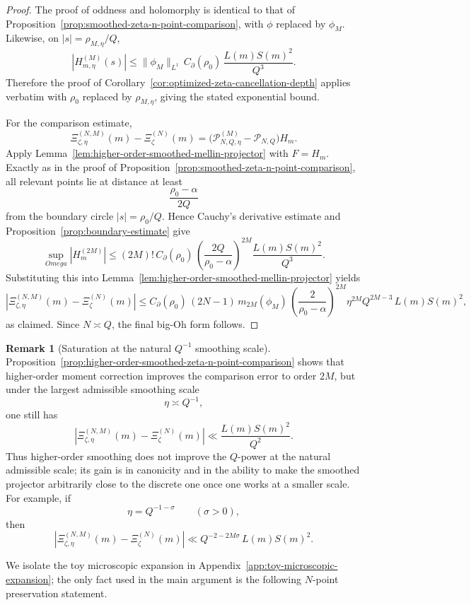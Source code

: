 \documentclass[11pt,a4paper]{amsart}
\def\Omega{Omega}%
\theoremstyle{plain}
\theoremstyle{definition}
\newtheorem{remark}[theorem]{Remark}
\begin{document}
\begin{proof}
The proof of oddness and holomorphy is identical to that of
Proposition~\ref{prop:smoothed-zeta-n-point-comparison}, with $\phi$ replaced
by $\phi_M$. Likewise, on $|s|=\rho_{M,\eta}/Q$,
\[
|H_{m,\eta}^{(M)}(s)|
\le
\|\phi_M\|_{L^1}\,C_{\partial}(\rho_0)\,\frac{L(m)S(m)^2}{Q^3}.
\]
Therefore the proof of
Corollary~\ref{cor:optimized-zeta-cancellation-depth} applies verbatim with
$\rho_0$ replaced by $\rho_{M,\eta}$, giving the stated exponential bound.

For the comparison estimate,
\[
\Xi_{\zeta,\eta}^{(N,M)}(m)-\Xi_{\zeta}^{(N)}(m)
=
\bigl(\mathcal P_{N,Q,\eta}^{(M)}-\mathcal P_{N,Q}\bigr)H_m.
\]
Apply Lemma~\ref{lem:higher-order-smoothed-mellin-projector} with $F=H_m$.
Exactly as in the proof of
Proposition~\ref{prop:smoothed-zeta-n-point-comparison}, all relevant points
lie at distance at least
\[
\frac{\rho_0-\alpha}{2Q}
\]
from the boundary circle $|s|=\rho_0/Q$. Hence Cauchy's derivative estimate
and Proposition~\ref{prop:boundary-estimate} give
\[
\sup_{\Omega}|H_m^{(2M)}|
\le
(2M)!\,C_{\partial}(\rho_0)\,
\left(\frac{2Q}{\rho_0-\alpha}\right)^{2M}
\frac{L(m)S(m)^2}{Q^3}.
\]
Substituting this into Lemma~\ref{lem:higher-order-smoothed-mellin-projector}
yields
\[
|\Xi_{\zeta,\eta}^{(N,M)}(m)-\Xi_{\zeta}^{(N)}(m)|
\le
C_{\partial}(\rho_0)\,(2N-1)\,m_{2M}(\phi_M)\,
\left(\frac{2}{\rho_0-\alpha}\right)^{2M}
\eta^{2M}Q^{2M-3}\,
L(m)S(m)^2,
\]
as claimed. Since $N\asymp Q$, the final big-Oh form follows.
\end{proof}

\begin{remark}[Saturation at the natural $Q^{-1}$ smoothing scale]
\label{rem:higher-order-smoothing-saturation}
Proposition~\ref{prop:higher-order-smoothed-zeta-n-point-comparison} shows that
higher-order moment correction improves the comparison error to order
$2M$, but under the largest admissible smoothing scale
\[
\eta\asymp Q^{-1},
\]
one still has
\[
|\Xi_{\zeta,\eta}^{(N,M)}(m)-\Xi_{\zeta}^{(N)}(m)|
\ll
\frac{L(m)S(m)^2}{Q^2}.
\]
Thus higher-order smoothing does not improve the $Q$-power at the natural
admissible scale; its gain is in canonicity and in the ability to make the
smoothed projector arbitrarily close to the discrete one once one works at a
smaller scale. For example, if
\[
\eta=Q^{-1-\sigma}
\qquad (\sigma>0),
\]
then
\[
|\Xi_{\zeta,\eta}^{(N,M)}(m)-\Xi_{\zeta}^{(N)}(m)|
\ll
Q^{-2-2M\sigma}\,L(m)S(m)^2.
\]
\end{remark}

We isolate the toy microscopic expansion in
Appendix~\ref{app:toy-microscopic-expansion}; the only fact used in the main
argument is the following $N$-point preservation statement.
\end{document}
